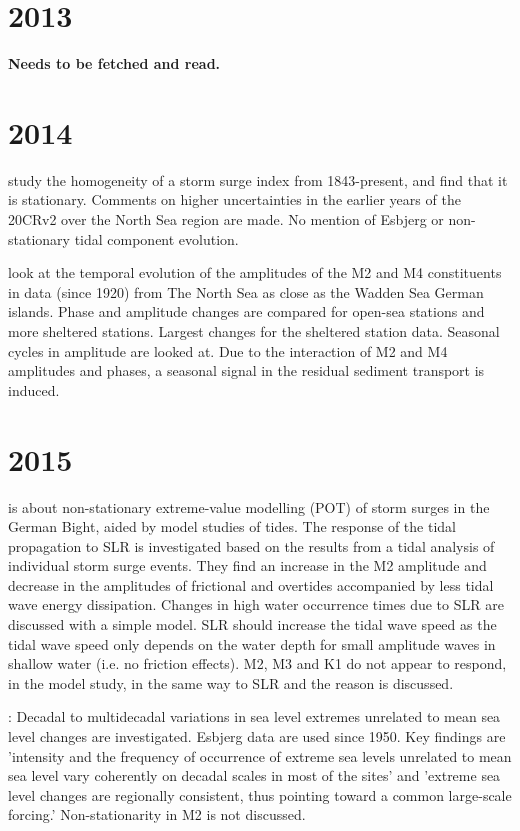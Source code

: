 \documentclass[12pt,a4]{article}
\begin{document}
\section{2013}
\cite{Mudersbach2013} \textbf{Needs to be fetched and read.}

\section{2014}
\cite{Dangendorf2014} study the homogeneity of a storm surge index from 1843-present, and find that it is stationary. Comments on higher uncertainties in the earlier years of the 20CRv2 over the North Sea region are made. No mention of Esbjerg or non-stationary tidal component evolution.

\cite{Grawe2014} look at the temporal evolution of the amplitudes of the M2 and M4 constituents in data (since 1920) from The North Sea as close as the Wadden Sea German islands. Phase and amplitude changes are compared for open-sea stations and more sheltered stations. Largest changes for the sheltered station data. Seasonal cycles in amplitude are looked at.  Due to the interaction of M2 and M4 amplitudes and phases, a seasonal signal in the residual sediment transport is induced. 

\section{2015}
\cite{Arns2015} is about non-stationary extreme-value modelling (POT) of storm surges in the German Bight, aided by model studies of tides. The response of the tidal propagation to SLR is investigated based on the results from a tidal analysis of individual storm surge events. They find an increase in the M2 amplitude and decrease in the amplitudes of frictional and overtides accompanied by less tidal wave energy dissipation. Changes in high water occurrence times due to SLR are discussed with a  simple model. SLR should increase the tidal wave speed as the tidal wave speed only depends on the
water depth for small amplitude waves in shallow water (i.e. no friction effects). M2, M3 and K1 do not appear to respond, in the model study, in the same way to SLR and the reason is discussed.

\cite{Marcos2015}: Decadal to multidecadal variations in sea level extremes unrelated to mean sea level changes are investigated. Esbjerg data are used since 1950. Key findings are 'intensity and the frequency of occurrence of extreme sea levels unrelated to mean sea level vary coherently on decadal scales in most of the sites' and 'extreme sea level changes are regionally consistent, thus pointing toward a common large-scale forcing.' Non-stationarity in M2 is not discussed. 
\end{document}
